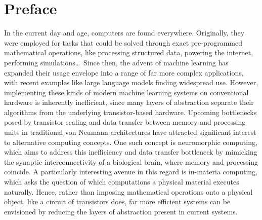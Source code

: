 \chapter*{Preface}\label{sec:Preface_EN}
In the current day and age, computers are found everywhere.
Originally, they were employed for tasks that could be solved through exact pre-programmed mathematical operations, like processing structured data, powering the internet, performing simulations\dots\,
Since then, the advent of machine learning has expanded their usage envelope into a range of far more complex applications, with recent examples like large language models finding widespread use.
However, implementing these kinds of modern machine learning systems on conventional hardware is inherently inefficient, since many layers of abstraction separate their algorithms from the underlying transistor-based hardware.
Upcoming bottlenecks posed by transistor scaling and data transfer between memory and processing units in traditional von Neumann architectures have attracted significant interest to alternative computing concepts.
One such concept is neuromorphic computing, which aims to address this inefficiency and data transfer bottleneck by mimicking the synaptic interconnectivity of a biological brain, where memory and processing coincide.
A particularly interesting avenue in this regard is in-materia computing, which asks the question of which computations a physical material executes naturally.
Hence, rather than imposing mathematical operations onto a physical object, like a circuit of transistors does, far more efficient systems can be envisioned by reducing the layers of abstraction present in current systems. \\ %

